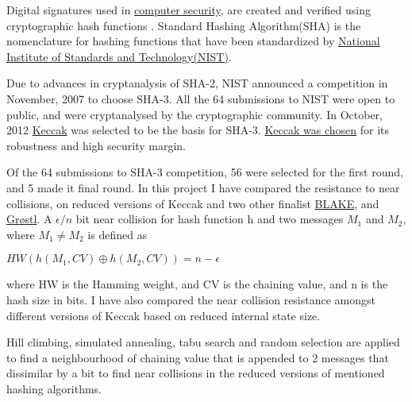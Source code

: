\begin{abstractpage}

Digital signatures used in \href{"http://en.wikipedia.org/wiki/Cryptographic\_hash\_function\#Applications"}
{computer security}, are created and verified using cryptographic hash functions \cite{00042}.
Standard Hashing Algorithm(SHA) is the nomenclature for hashing functions that have been standardized
by \href{"http://www.nist.gov/index.html"}{National Institute of Standards and Technology(NIST)}.

Due to advances in cryptanalysis of SHA-2, NIST announced a competition in November, 2007 to choose SHA-3. 
All the 64 submissions to NIST were open to public, and were cryptanalysed by the cryptographic community. 
In October, 2012 \href{"http://keccak.noekeon.org/"}{Keccak} was selected to be the basis for SHA-3. 
\href{"http://csrc.nist.gov/groups/ST/hash/sha-3/sha-3\_selection\_announcement.pdf"}{Keccak was chosen}
for its robustness and high security margin.

Of the 64 submissions to SHA-3 competition, 56 were selected for the first round, and 5 made it final round.
In this project I have compared the resistance to near collisions, on reduced versions of Keccak and two other
finalist \href{"https://131002.net/blake/"}{BLAKE}, and \href{"http://www.groestl.info/"}{Gr{\o}stl}. 
A $\epsilon / n $ bit near collision for hash function h and two messages $M_{1}$ and $M_{2}$, where
$M_{1} \neq M_{2}$ is defined as
\begin{center}$HW( h( M_{1}, CV ) \oplus h( M_{2}, CV ) ) = n - \epsilon $\end{center}
where HW is the Hamming weight, and CV is the chaining value, and n is the hash size in bits. I have
also compared the near collision resistance amongst different versions of Keccak based on reduced internal
state size.

Hill climbing, simulated annealing, tabu search and random selection are applied to find a neighbourhood of chaining
value that is appended to 2 messages that dissimilar by a bit to find near collisions in the reduced versions of
mentioned hashing algorithms.
  
\end{abstractpage}

